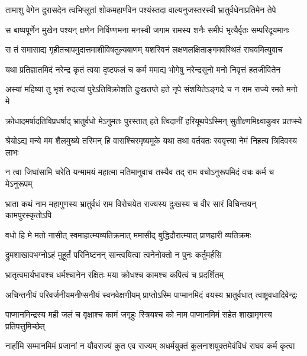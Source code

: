 
\twolineshloka
{तामाशु वेगेन दुरासदेन त्वभिप्लुतां शोकमहार्णवेन}
{पश्यंस्तदा वाल्यनुजस्तरस्वी भ्रातुर्वधेनाप्रतिमेन तेपे} %

\twolineshloka
{स बाष्पपूर्णेन मुखेन पश्यन् क्षणेन निर्विण्णमना मनस्वी}
{जगाम रामस्य शनैः समीपं भृत्यैर्वृतः सम्परिदूयमानः} %

\twolineshloka
{स तं समासाद्य गृहीतचापमुदात्तमाशीविषतुल्यबाणम्}
{यशस्विनं लक्षणलक्षिताङ्गमवस्थितं राघवमित्युवाच} %

\twolineshloka
{यथा प्रतिज्ञातमिदं नरेन्द्र कृतं त्वया दृष्टफलं च कर्म}
{ममाद्य भोगेषु नरेन्द्रसूनो मनो निवृत्तं हतजीवितेन} %

\twolineshloka
{अस्यां महिष्यां तु भृशं रुदत्यां पुरेऽतिविक्रोशति दुःखतप्ते}
{हते नृपे संशयितेऽङ्गदे च न राम राज्ये रमते मनो मे} %

\twolineshloka
{क्रोधादमर्षादतिविप्रधर्षाद् भ्रातुर्वधो मेऽनुमतः पुरस्तात्}
{हते त्विदानीं हरियूथपेऽस्मिन् सुतीक्ष्णमिक्ष्वाकुवर प्रतप्स्ये} %

\twolineshloka
{श्रेयोऽद्य मन्ये मम शैलमुख्ये तस्मिन् हि वासश्चिरमृष्यमूके}
{यथा तथा वर्तयतः स्ववृत्त्या नेमं निहत्य त्रिदिवस्य लाभः} %

\twolineshloka
{न त्वा जिघांसामि चरेति यन्मामयं महात्मा मतिमानुवाच}
{तस्यैव तद् राम वचोऽनुरूपमिदं वचः कर्म च मेऽनुरूपम्} %

\twolineshloka
{भ्राता कथं नाम महागुणस्य भ्रातुर्वधं राम विरोचयेत}
{राज्यस्य दुःखस्य च वीर सारं विचिन्तयन् कामपुरस्कृतोऽपि} %

\twolineshloka
{वधो हि मे मतो नासीत् स्वमाहात्म्यव्यतिक्रमात्}
{ममासीद् बुद्धिदौरात्म्यात् प्राणहारी व्यतिक्रमः} %

\twolineshloka
{द्रुमशाखावभग्नोऽहं मुहूर्तं परिनिष्टनन्}
{सान्त्वयित्वा त्वनेनोक्तो न पुनः कर्तुमर्हसि} %

\twolineshloka
{भ्रातृत्वमार्यभावश्च धर्मश्चानेन रक्षितः}
{मया क्रोधश्च कामश्च कपित्वं च प्रदर्शितम्} %

\twolineshloka
{अचिन्तनीयं परिवर्जनीयमनीप्सनीयं स्वनवेक्षणीयम्}
{प्राप्तोऽस्मि पाप्मानमिदं वयस्य भ्रातुर्वधात् त्वाष्ट्रवधादिवेन्द्रः} %

\twolineshloka
{पाप्मानमिन्द्रस्य मही जलं च वृक्षाश्च कामं जगृहुः स्त्रियश्च}
{को नाम पाप्मानमिमं सहेत शाखामृगस्य प्रतिपत्तुमिच्छेत्} %

\twolineshloka
{नार्हामि सम्मानमिमं प्रजानां न यौवराज्यं कुत एव राज्यम्}
{अधर्मयुक्तं कुलनाशयुक्तमेवंविधं राघव कर्म कृत्वा} %

